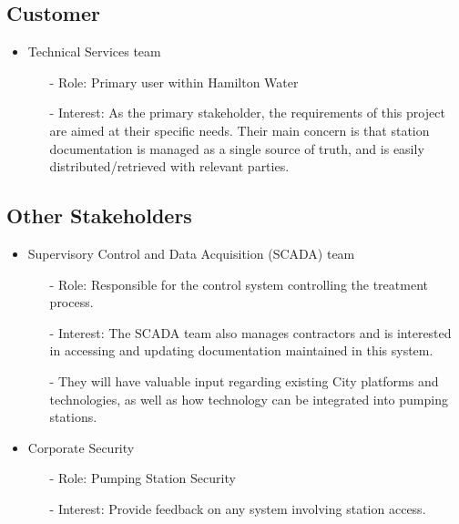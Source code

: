 \documentclass[12pt]{article}
\begin{document}
\subsection{Customer}

\begin{itemize}
    \item Technical Services team
    \begin{itemize}
        \item[-] Role: Primary user within Hamilton Water
        \item[-] Interest: As the primary stakeholder, the requirements 
        of this project are aimed at their specific needs. Their main concern
        is that station documentation is managed as a single source of truth,
        and is easily distributed/retrieved with relevant parties.
    \end{itemize} 
\end{itemize}
\subsection{Other Stakeholders}

\begin{itemize}
    \item Supervisory Control and Data Acquisition (SCADA) team
    \begin{itemize}
        \item[-] Role: Responsible for the control system controlling
        the treatment process.
        \item[-] Interest: The SCADA team also manages contractors and is 
        interested in accessing and updating documentation maintained 
        in this system. 
        \item[-] They will have valuable input regarding existing City 
        platforms and technologies, as well as how technology can be 
        integrated into pumping stations.
    \end{itemize}
    \item Corporate Security

    \begin{itemize}
        \item[-] Role: Pumping Station Security
        \item[-] Interest: Provide feedback on any system involving station 
        access.
    \end{itemize}
\end{itemize}
\end{document}
